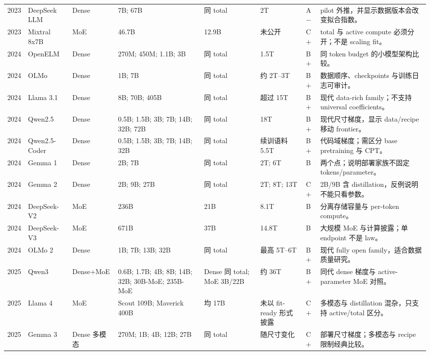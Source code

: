 \documentclass[UTF8,10pt,a4paper,fontset=none]{ctexart}
\begin{document}
\begin{longtable}{C{0.55cm}p{1.50cm}p{1.10cm}p{3.20cm}p{2.00cm}p{1.80cm}C{0.65cm}p{3.80cm}}
2023 & DeepSeek LLM\cite{deepseekllm2024} & Dense & 7B; 67B & 同 total & 2T & A$-$ & pilot 外推，并显示数据版本会改变拟合指数。 \\
2023 & Mixtral 8x7B\cite{mixtral2024} & MoE & 46.7B & 12.9B & 未公开 & C$+$ & total 与 active compute 必须分开；不是 scaling fit。 \\
2024 & Open\allowbreak ELM\cite{openelm2024} & Dense & 270M; 450M; 1.1B; 3B & 同 total & 1.5T & B$+$ & 同 token budget 的小模型架构比较。 \\
2024 & OLMo\cite{olmo2024} & Dense & 1B; 7B & 同 total & 约 2T--3T & B$+$ & 数据顺序、checkpoints 与训练日志可审计。 \\
2024 & Llama 3.1\cite{llama31} & Dense & 8B; 70B; 405B & 同 total & 超过 15T & B$+$ & 现代 data-rich family；不支持 universal coefficients。 \\
2024 & Qwen2.5\cite{qwen25} & Dense & 0.5B; 1.5B; 3B; 7B; 14B; 32B; 72B & 同 total & 18T & B$+$ & 现代尺寸梯度，显示 data/recipe 移动 frontier。 \\
2024 & Qwen2.5-Coder\cite{qwen25coder} & Dense & 0.5B; 1.5B; 3B; 7B; 14B; 32B & 同 total & 续训语料 5.5T & B$+$ & 代码域梯度；需区分 base pretraining 与 CPT。 \\
2024 & Gemma 1\cite{gemma1} & Dense & 2B; 7B & 同 total & 2T; 6T & B & 两个点；说明部署家族不固定 tokens/parameter。 \\
2024 & Gemma 2\cite{gemma2} & Dense & 2B; 9B; 27B & 同 total & 2T; 8T; 13T & C$+$ & 2B/9B 含 distillation，反例说明不能只看参数。 \\
2024 & DeepSeek-V2\cite{deepseekv2} & MoE & 236B & 21B & 8.1T & B & 分离存储容量与 per-token compute。 \\
2024 & DeepSeek-V3\cite{deepseekv3} & MoE & 671B & 37B & 14.8T & B & 大规模 MoE 与计算披露；单 endpoint 不是 law。 \\
2024 & OLMo 2\cite{olmo2} & Dense & 1B; 7B; 13B; 32B & 同 total & 最高 5T--6T & B$+$ & 现代 fully open family，适合数据质量研究。 \\
2025 & Qwen3\cite{qwen3} & Dense+\allowbreak MoE & 0.6B; 1.7B; 4B; 8B; 14B; 32B; 30B-MoE; 235B-MoE & Dense 同 total; MoE 3B/22B & 约 36T & B$+$ & 同代 dense 梯度与 active-parameter MoE 对照。 \\
2025 & Llama 4\cite{llama4} & MoE & Scout 109B; Maverick 400B & 均 17B & 未以 fit-ready 形式披露 & C$+$ & 多模态与 distillation 混杂，只支持 active/total 区分。 \\
2025 & Gemma 3\cite{gemma3} & Dense 多模态 & 270M; 1B; 4B; 12B; 27B & 同 total & 随尺寸变化 & C$+$ & 部署尺寸梯度；多模态与 recipe 限制经典比较。 \\

\end{longtable}
\end{document}
